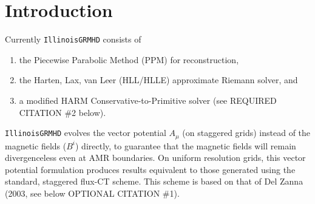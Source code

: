 \documentclass{article}
\begin{document}
\begin{abstract}
{\tt IllinoisGRMHD} solves the equations of General Relativistic 
MagnetoHydroDynamics (GRMHD) using a high-resolution shock capturing scheme.
It is a rewrite of the Illinois Numerical Relativity (ILNR) group's GRMHD 
code, and generates results that agree to roundoff error with that original
code. Its feature set coincides with the features of the ILNR group's 
recent code (ca. 2009--2014), which was used in their modeling of the
following systems:
\begin{enumerate}
\item Magnetized circumbinary disk accretion onto binary black holes
\item Magnetized black hole--neutron star mergers
\item Magnetized Bondi flow, Bondi-Hoyle-Littleton accretion
\item White dwarf--neutron star mergers
\end{enumerate}

{\tt IllinoisGRMHD} is particularly good at modeling GRMHD flows into black holes
without the need for excision. Its HARM-based conservative-to-primitive solver 
has also been modified to check the physicality of conservative variables 
prior to primitive inversion, and move them into the physical range if they 
become unphysical.

\end{abstract}


\section{Introduction}
\label{sec:intro}

Currently {\tt IllinoisGRMHD} consists of
\begin{enumerate}
\item the Piecewise Parabolic Method (PPM) for reconstruction, 
\item the Harten, Lax, van Leer (HLL/HLLE) approximate Riemann solver, and
\item a modified HARM Conservative-to-Primitive solver (see REQUIRED
  CITATION \#2 below).
\end{enumerate}

{\tt IllinoisGRMHD} evolves the vector potential $A_{\mu}$ (on staggered grids) 
instead of the magnetic fields ($B^i$) directly, to guarantee that the 
magnetic fields will remain divergenceless even at AMR boundaries. On 
uniform resolution grids, this vector potential formulation produces 
results equivalent to those generated using the standard, staggered 
flux-CT scheme. This scheme is based on that of Del Zanna (2003, see
below OPTIONAL CITATION \#1).
\end{document}
